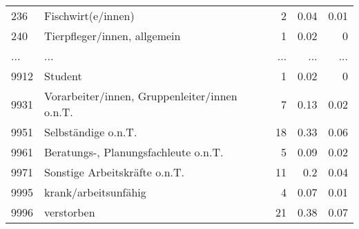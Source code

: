 \begin{longtable}{lXrrr}
        236 & \multicolumn{1}{X}{Fischwirt(e/innen)} & %
          \num{2} &
          \num[round-mode=places,round-precision=2]{0,04} &
          \num[round-mode=places,round-precision=2]{0,01} \\
        240 & \multicolumn{1}{X}{Tierpfleger/innen, allgemein} & %
          \num{1} &
          \num[round-mode=places,round-precision=2]{0,02} &
          \num[round-mode=places,round-precision=2]{0} \\
       ... & ... & ... & ... & ... \\
        9912 & \multicolumn{1}{X}{Student} & %
          \num{1} &
          \num[round-mode=places,round-precision=2]{0,02} &
          \num[round-mode=places,round-precision=2]{0} \\

        9931 & \multicolumn{1}{X}{Vorarbeiter/innen, Gruppenleiter/innen o.n.T.} & %
          \num{7} &
          \num[round-mode=places,round-precision=2]{0,13} &
          \num[round-mode=places,round-precision=2]{0,02} \\

        9951 & \multicolumn{1}{X}{Selbständige o.n.T.} & %
          \num{18} &
          \num[round-mode=places,round-precision=2]{0,33} &
          \num[round-mode=places,round-precision=2]{0,06} \\

        9961 & \multicolumn{1}{X}{Beratungs-, Planungsfachleute o.n.T.} & %
          \num{5} &
          \num[round-mode=places,round-precision=2]{0,09} &
          \num[round-mode=places,round-precision=2]{0,02} \\

        9971 & \multicolumn{1}{X}{Sonstige Arbeitskräfte o.n.T.} & %
          \num{11} &
          \num[round-mode=places,round-precision=2]{0,2} &
          \num[round-mode=places,round-precision=2]{0,04} \\

        9995 & \multicolumn{1}{X}{krank/arbeitsunfähig} & %
          \num{4} &
          \num[round-mode=places,round-precision=2]{0,07} &
          \num[round-mode=places,round-precision=2]{0,01} \\

        9996 & \multicolumn{1}{X}{verstorben} & %
          \num{21} &
          \num[round-mode=places,round-precision=2]{0,38} &
          \num[round-mode=places,round-precision=2]{0,07} \\


\end{longtable}
